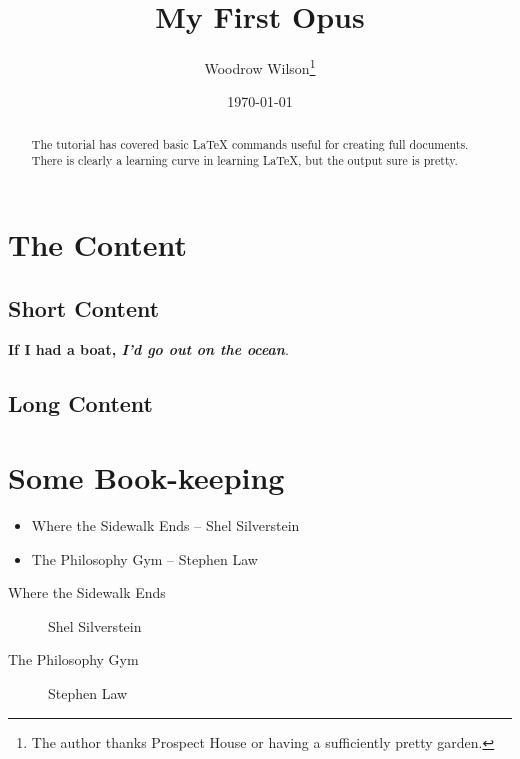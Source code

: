 \documentclass{article}
\title{My First Opus}
\date{\today}
\author{Woodrow Wilson\thanks{The author thanks
    Prospect House or having a sufficiently pretty garden.}
}
\begin{document}
\begin{titlepage}
  \maketitle

  \begin{abstract}
    The tutorial has covered basic \LaTeX{} commands useful for creating full
    documents. There is clearly a learning curve in learning LaTeX{}, but the
    output sure is pretty.
  \end{abstract}
\end{titlepage}

\section{The Content}

\subsection{Short Content}

\textbf{If I had a boat, \textit{I’d go out on the ocean}}.

\begin{textsf}
  
\end{textsf}

\subsection{Long Content}

\begin{tiny}
  
\end{tiny}

\appendix

\section{Some Book-keeping}

\begin{itemize}
\item Where the Sidewalk Ends -- Shel Silverstein
\item The Philosophy Gym -- Stephen Law
\end{itemize}

\begin{description}
\item[Where the Sidewalk Ends] Shel Silverstein
\item[The Philosophy Gym] Stephen Law
\end{description}
\end{document}
